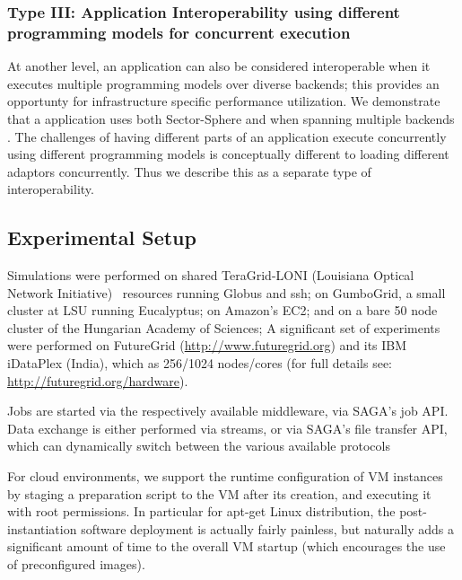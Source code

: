 \documentclass[3p,twocolumn]{elsarticle}
\begin{document}
\subsubsection{Type III: Application Interoperability using different
  programming models for concurrent execution}
%
%

At another level, an application can also be considered interoperable
when it executes multiple programming models  over
diverse backends; this provides an opportunty for infrastructure
specific performance utilization.  We demonstrate that a \wc
application uses both Sector-Sphere and \smr when spanning multiple
backends .  The challenges of having different parts of
an application execute concurrently using different programming models
is conceptually different to loading different adaptors concurrently.
Thus we describe this as a separate type of interoperability.

\subsection{Experimental Setup}

Simulations were performed on shared TeraGrid-LONI (Louisiana Optical
Network Initiative)~\cite{loni-url} resources running Globus and ssh;
on GumboGrid, a small cluster at LSU running Eucalyptus; on Amazon's
EC2; and on a bare 50 node cluster of the Hungarian Academy of Sciences;
A significant set of experiments were performed on FutureGrid
(\url{http://www.futuregrid.org}) and its IBM iDataPlex (India), which
as 256/1024 nodes/cores (for full details see:
\url{http://futuregrid.org/hardware}).

Jobs are started via the respectively available middleware, via
SAGA's job API.  Data exchange is either performed via streams, or via
SAGA's file transfer API, which can dynamically switch between the
various available protocols 

For cloud environments, we support the runtime configuration of VM
instances by staging a preparation script to the VM after its
creation, and executing it with root permissions.  In particular for
apt-get  Linux distribution, the
post-instantiation software deployment is actually fairly painless,
but naturally adds a significant amount of time to the overall VM
startup (which encourages the use of preconfigured images).
\end{document}
